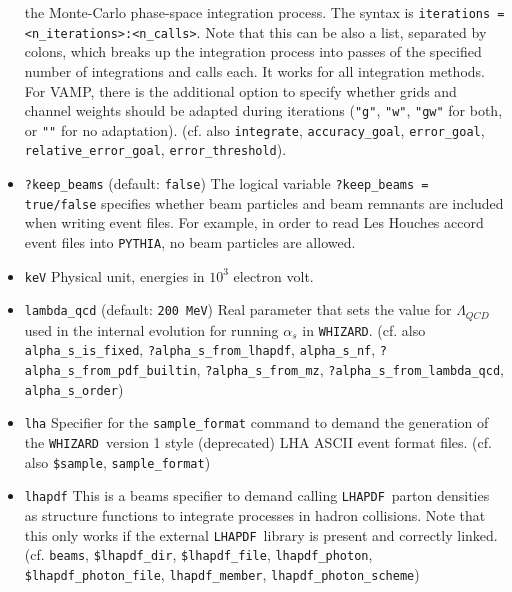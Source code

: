\documentclass[12pt]{book}
\newcommand{\ttt}[1]{\texttt{#1}}
\newcommand{\whizard}{\texttt{WHIZARD}}
\newcommand{\pythia}{\texttt{PYTHIA}}
\newcommand{\lhapdf}{\texttt{LHAPDF}}
\begin{document}
\begin{itemize}
the Monte-Carlo phase-space integration process. The syntax is 
\ttt{iterations = <n\_iterations>:<n\_calls>}. Note that this can be
also a list, separated by colons, which breaks up the integration
process into passes of the specified number of integrations and calls
each. It works for all integration methods. For VAMP, there is the
additional option to specify whether grids and channel weights should
be adapted during iterations (\ttt{"g"}, \ttt{"w"},
\ttt{"gw"} for both, or \ttt{""} for no adaptation).   (cf. also
\ttt{integrate}, \ttt{accuracy\_goal}, \ttt{error\_goal},
\ttt{relative\_error\_goal}, \ttt{error\_threshold}).   
\item
\ttt{?keep\_beams} \qquad (default: \ttt{false}) \newline
The logical variable \texttt{?keep\_beams = true/false} specifies whether
beam particles and beam remnants are included when writing event files.
For example, in order to read Les Houches accord event files into \pythia,
no beam particles are allowed.
\item
\ttt{keV} \newline
Physical unit, energies in $10^3$ electron volt. 
\item
\ttt{lambda\_qcd} \qquad (default: \ttt{200 MeV}) \newline
Real parameter that sets the value for $\Lambda_{QCD}$ used in the
internal evolution for running $\alpha_s$ in \whizard. (cf. also 
\ttt{alpha\_s\_is\_fixed}, \ttt{?alpha\_s\_from\_lhapdf},
\ttt{alpha\_s\_nf}, \ttt{?alpha\_s\_from\_pdf\_builtin}, 
\ttt{?alpha\_s\_from\_mz}, 
\ttt{?alpha\_s\_from\_lambda\_qcd}, \newline \ttt{alpha\_s\_order}) 
\item
\ttt{lha} \newline 
Specifier for the \ttt{sample\_format} command to demand the
generation of the \whizard\ version 1 style (deprecated) LHA ASCII event
format files. (cf. also \ttt{\$sample}, \newline
\ttt{sample\_format}) 
\item
\ttt{lhapdf} \newline
This is a beams specifier to demand calling \lhapdf\ parton densities as
structure functions to integrate processes in hadron collisions. Note
that this only works if the external \lhapdf\ library is present and
correctly linked. (cf. \ttt{beams}, \ttt{\$lhapdf\_dir},
\ttt{\$lhapdf\_file}, \ttt{lhapdf\_photon},
\ttt{\$lhapdf\_photon\_file}, \ttt{lhapdf\_member},
\ttt{lhapdf\_photon\_scheme}) 

\end{itemize}
\end{document}
